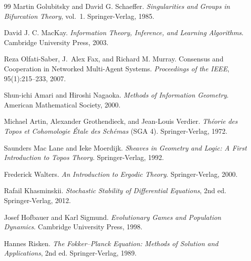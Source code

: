 \documentclass[12pt]{article}
\begin{document}
\begin{thebibliography}{99}
Martin Golubitsky and David G. Schaeffer.
\textit{Singularities and Groups in Bifurcation Theory}, vol.~1.
Springer-Verlag, 1985.

David J. C. MacKay.
\textit{Information Theory, Inference, and Learning Algorithms}.
Cambridge University Press, 2003.

Reza Olfati-Saber, J.~Alex Fax, and Richard M. Murray.
Consensus and Cooperation in Networked Multi-Agent Systems.
\textit{Proceedings of the IEEE}, 95(1):215--233, 2007.

Shun-ichi Amari and Hiroshi Nagaoka.
\textit{Methods of Information Geometry}.
American Mathematical Society, 2000.

Michael Artin, Alexander Grothendieck, and Jean-Louis Verdier.
\textit{Théorie des Topos et Cohomologie Étale des Schémas} (SGA 4).
Springer-Verlag, 1972.

Saunders Mac Lane and Ieke Moerdijk.
\textit{Sheaves in Geometry and Logic: A First Introduction to Topos Theory}.
Springer-Verlag, 1992.

Frederick Walters.
\textit{An Introduction to Ergodic Theory}.
Springer-Verlag, 2000.

Rafail Khasminskii.
\textit{Stochastic Stability of Differential Equations}, 2nd ed.
Springer-Verlag, 2012.

Josef Hofbauer and Karl Sigmund.
\textit{Evolutionary Games and Population Dynamics}.
Cambridge University Press, 1998.

Hannes Risken.
\textit{The Fokker--Planck Equation: Methods of Solution and Applications}, 2nd ed.
Springer-Verlag, 1989.

\end{thebibliography}
\end{document}
